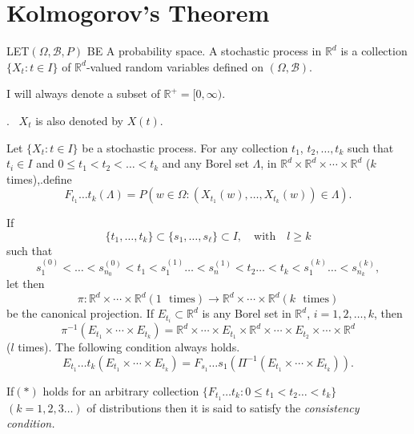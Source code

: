 \chapter{Kolmogorov's Theorem}\label{chap2}

\begin{defi*}
LET\pageoriginale $(\Omega,\mathscr{B},P)$ BE A probability space. A
stochastic process in $\mathbb{R}^{d}$ is a collection $\{X_{t}:t\in
I\}$ of $\mathbb{R}^{d}$-valued random variables defined on $(\Omega,\mathscr{B})$.
\end{defi*}

\begin{note}\label{chap2-note1}
I will always denote a subset of $\mathbb{R}^{+}=[0,\infty)$. 

.~ $X_{t}$ is also denoted by $X(t)$.

Let $\{X_{t}:t\in I\}$ be a stochastic process. For any collection
$t_{1}$, $t_{2},\ldots,t_{k}$ such that $t_{i}\in I$ and $0\leq
t_{1}<t_{2}<\ldots <t_{k}$ and any Borel set $\Lambda$, in
$\mathbb{R}^{d}\times \mathbb{R}^{d}\times \cdots \times \mathbb{R}^{d}$
($k$ times),.\@ define
$$
F_{t_{1}}\ldots t_{k}(\Lambda)=P(w\in
\Omega:(X_{t_{1}}(w),\ldots,X_{t_{k}}(w))\in \Lambda).
$$

If
$$
\{t_{1},\ldots,t_{k}\}\subset \{s_{1},\ldots,s_{\ell}\}\subset
I,\quad\text{with}\quad l\geq k
$$
such that
$$
s^{(0)}_{1}<\ldots<s^{(0)}_{n_{0}}<t_{1}<s^{(1)}_{1}\ldots
<s^{(1)}_{n}<t_{2}\ldots <t_{k}<s^{(k)}_{1}\ldots <s^{(k)}_{n_{k}},
$$
let then
$$
\pi:\mathbb{R}^{d}\times\cdots\times \mathbb{R}^{d}(1\text{~
  times})\to \mathbb{R}^{d}\times\cdots\times \mathbb{R}^{d}(k\text{~
  times})
$$
be the canonical projection. If $E_{t_{i}}\subset \mathbb{R}^{d}$ is
any Borel set in $\mathbb{R}^{d}$, $i=1,2,\ldots,k$, then
$$
\pi^{-1}(E_{t_{1}}\times\cdots\times
E_{t_{k}})=\mathbb{R}^{d}\times\cdots\times E_{t_{1}}\times
\mathbb{R}^{d}\times\cdots\times E_{t_{2}}\times\cdots\times
\mathbb{R}^{d}
$$
($l$ times). The following condition always holds.
\begin{equation*}
E_{t_{1}}\ldots t_{k}(E_{t_{1}}\times\cdots\times
E_{t_{k}})=F_{s_{1}}\ldots s_{1}(\Pi^{-1}(E_{t_{1}}\times\cdots\times E_{t_{k}})).\tag{*}
\end{equation*}

If\pageoriginale $(*)$ holds for an arbitrary collection
$\{F_{t_{1}}\ldots t_{k}: 0\leq t_{1}<t_{2}\ldots <t_{k}\}$
$(k=1,2,3\ldots)$ of distributions then it is said to satisfy
the {\em consistency condition.}
\end{note}


